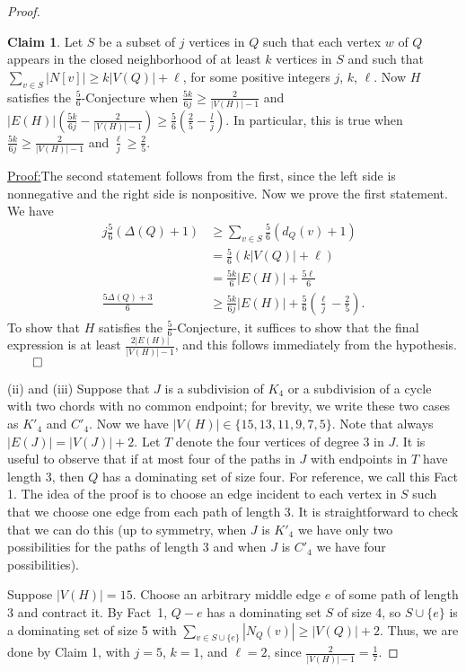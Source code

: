 \documentclass[12pt]{amsart}
\theoremstyle{plain}
\theoremstyle{definition}
\newtheorem{clm}{Claim}
\theoremstyle{remark}
\newenvironment{claimproof}[1]{\par\noindent\underline{Proof:}\space#1}{\leavevmode\unskip\penalty9999
\hbox{}\nobreak\hfill\quad\hbox{$\qed$}}
\begin{document}
\begin{proof}
\begin{clm}
Let $S$ be a subset of $j$ vertices in $Q$ such that each vertex $w$ of $Q$ appears in
the closed neighborhood of at least $k$ vertices in $S$ 
and such that $\sum_{v\in S}|N[v]|\ge k|V(Q)|+\ell$, for some positive integers
$j$, $k$, $\ell$.  Now $H$ satisfies the $\frac56$-Conjecture when $\frac{5k}{6j}\ge
\frac2{|V(H)|-1}$ and $|E(H)|(\frac{5k}{6j} - \frac2{|V(H)|-1}) \ge
\frac56\left(\frac25 - \frac{l}j\right)$.  In particular, this is true when
$\frac{5k}{6j}\ge \frac2{|V(H)|-1}$ and $\frac{\ell}{j}\ge\frac25$. 
\end{clm}
\begin{claimproof}
The second statement follows from the first, since the left side is nonnegative
and the right side is nonpositive.  Now we prove the first statement.
We have 
\begin{align*}
j\frac56(\Delta(Q)+1) &\ge \sum_{v \in S}\frac56(d_Q(v)+1)\\ 
& = \frac56(k|V(Q)|+\ell) \\ 
&= \frac{5k}6|E(H)|+\frac{5\ell}6\\
\frac{5\Delta(Q)+3}6 &\ge
\frac{5k}{6j}|E(H)|+\frac{5}6\left(\frac{\ell}{j}-\frac25\right).
\end{align*}
To show that $H$ satisfies the $\frac56$-Conjecture,
it suffices to show that the final expression is at least
$\frac{2|E(H)|}{|V(H)|-1}$, and this follows immediately from the hypothesis.
\end{claimproof}


(ii) and (iii) Suppose that $J$ is a subdivision of $K_4$ or a subdivision
of a cycle with two chords with no common endpoint; for brevity, we write these
two cases as $K'_4$ and $C'_4$.  Now we have
$|V(H)|\in\{15,13,11,9,7,5\}$.  Note that always $|E(J)|=|V(J)|+2$.  Let $T$
denote the four vertices of degree 3 in $J$.
It is useful to observe that if at most four of the paths in $J$ with endpoints in
$T$ have length 3, then $Q$ has a dominating set of size four.  For reference,
we call this Fact 1.  The idea of the proof is to
choose an edge incident to each vertex in $S$ such that we choose one edge from
each path of length 3.  It is straightforward to check that we can do this (up
to symmetry, when $J$ is $K'_4$ we have only two possibilities for the paths of
length 3 and when $J$ is $C'_4$ we have four possibilities).

Suppose $|V(H)|=15$.  Choose an arbitrary middle edge $e$ of some path of length
3 and contract it. By Fact~1, $Q-e$ has a dominating set $S$ of size 4, so
$S\cup\{e\}$ is a dominating set of size 5 with $\sum_{v\in
S\cup\{e\}}|N_Q(v)|\ge |V(Q)|+2$.  Thus, we are done by Claim 1, with $j=5$,
$k=1$, and $\ell=2$, since $\frac2{|V(H)|-1}=\frac17$.


\end{proof}
\end{document}
